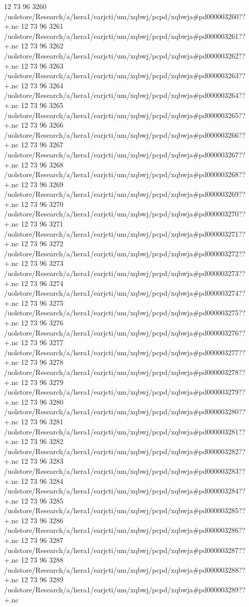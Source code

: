 12 73 96
3260
/uolstore/Research/a/hera1/earjcti/um/xqbwj/pcpd/xqbwja#pd000003260??+.nc
12 73 96
3261
/uolstore/Research/a/hera1/earjcti/um/xqbwj/pcpd/xqbwja#pd000003261??+.nc
12 73 96
3262
/uolstore/Research/a/hera1/earjcti/um/xqbwj/pcpd/xqbwja#pd000003262??+.nc
12 73 96
3263
/uolstore/Research/a/hera1/earjcti/um/xqbwj/pcpd/xqbwja#pd000003263??+.nc
12 73 96
3264
/uolstore/Research/a/hera1/earjcti/um/xqbwj/pcpd/xqbwja#pd000003264??+.nc
12 73 96
3265
/uolstore/Research/a/hera1/earjcti/um/xqbwj/pcpd/xqbwja#pd000003265??+.nc
12 73 96
3266
/uolstore/Research/a/hera1/earjcti/um/xqbwj/pcpd/xqbwja#pd000003266??+.nc
12 73 96
3267
/uolstore/Research/a/hera1/earjcti/um/xqbwj/pcpd/xqbwja#pd000003267??+.nc
12 73 96
3268
/uolstore/Research/a/hera1/earjcti/um/xqbwj/pcpd/xqbwja#pd000003268??+.nc
12 73 96
3269
/uolstore/Research/a/hera1/earjcti/um/xqbwj/pcpd/xqbwja#pd000003269??+.nc
12 73 96
3270
/uolstore/Research/a/hera1/earjcti/um/xqbwj/pcpd/xqbwja#pd000003270??+.nc
12 73 96
3271
/uolstore/Research/a/hera1/earjcti/um/xqbwj/pcpd/xqbwja#pd000003271??+.nc
12 73 96
3272
/uolstore/Research/a/hera1/earjcti/um/xqbwj/pcpd/xqbwja#pd000003272??+.nc
12 73 96
3273
/uolstore/Research/a/hera1/earjcti/um/xqbwj/pcpd/xqbwja#pd000003273??+.nc
12 73 96
3274
/uolstore/Research/a/hera1/earjcti/um/xqbwj/pcpd/xqbwja#pd000003274??+.nc
12 73 96
3275
/uolstore/Research/a/hera1/earjcti/um/xqbwj/pcpd/xqbwja#pd000003275??+.nc
12 73 96
3276
/uolstore/Research/a/hera1/earjcti/um/xqbwj/pcpd/xqbwja#pd000003276??+.nc
12 73 96
3277
/uolstore/Research/a/hera1/earjcti/um/xqbwj/pcpd/xqbwja#pd000003277??+.nc
12 73 96
3278
/uolstore/Research/a/hera1/earjcti/um/xqbwj/pcpd/xqbwja#pd000003278??+.nc
12 73 96
3279
/uolstore/Research/a/hera1/earjcti/um/xqbwj/pcpd/xqbwja#pd000003279??+.nc
12 73 96
3280
/uolstore/Research/a/hera1/earjcti/um/xqbwj/pcpd/xqbwja#pd000003280??+.nc
12 73 96
3281
/uolstore/Research/a/hera1/earjcti/um/xqbwj/pcpd/xqbwja#pd000003281??+.nc
12 73 96
3282
/uolstore/Research/a/hera1/earjcti/um/xqbwj/pcpd/xqbwja#pd000003282??+.nc
12 73 96
3283
/uolstore/Research/a/hera1/earjcti/um/xqbwj/pcpd/xqbwja#pd000003283??+.nc
12 73 96
3284
/uolstore/Research/a/hera1/earjcti/um/xqbwj/pcpd/xqbwja#pd000003284??+.nc
12 73 96
3285
/uolstore/Research/a/hera1/earjcti/um/xqbwj/pcpd/xqbwja#pd000003285??+.nc
12 73 96
3286
/uolstore/Research/a/hera1/earjcti/um/xqbwj/pcpd/xqbwja#pd000003286??+.nc
12 73 96
3287
/uolstore/Research/a/hera1/earjcti/um/xqbwj/pcpd/xqbwja#pd000003287??+.nc
12 73 96
3288
/uolstore/Research/a/hera1/earjcti/um/xqbwj/pcpd/xqbwja#pd000003288??+.nc
12 73 96
3289
/uolstore/Research/a/hera1/earjcti/um/xqbwj/pcpd/xqbwja#pd000003289??+.nc
